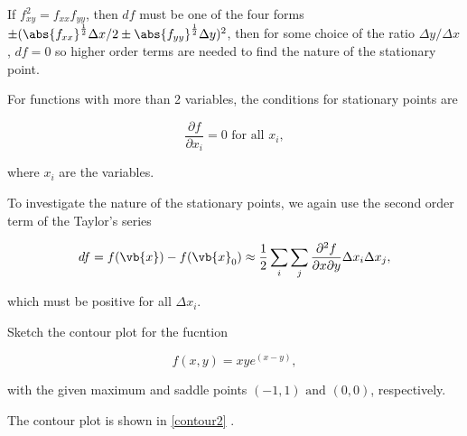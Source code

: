 \documentclass[english,a4paper,12pt]{report}
\begin{document}
If \(f_{xy}^2 = f_{xx}f_{yy}\), then \(df\) must be one of the four forms \(\pm  (\abs{f_{xx} }^{\frac{1}{2} } \Delta x /2 \pm \abs{f_{yy} }^{\frac{1}{2} }\Delta y)^2\), then for some choice of the ratio \(\Delta y / \Delta x\), \(df = 0\) so higher order terms are needed to find the nature of the stationary point. 

For functions with more than 2 variables, the conditions for stationary points are 

\begin{equation}
    \frac{\partial f}{\partial x_{i} } = 0 \text{ for all }  x_{i},
\end{equation}

where \(x_{i} \) are the variables. 

To investigate the nature of the stationary points, we again use the second order term of the Taylor's series

\begin{equation}
    df = f(\vb{x} ) - f(\vb{x} _{0} ) \approx \frac{1}{2}\sum_{i} \sum_{j} \frac{\partial^2 f}{\partial x \partial y} \Delta x_{i}\Delta x_{j},      
\end{equation}

which must be positive for all \(\Delta x_{i} \).

{Sketch the contour plot for the fucntion 

\begin{equation}
	f(x,y) = xy e^{(x-y)}, 
\end{equation}

with the given maximum and saddle points \((-1,1) \text { and } (0,0)\), respectively. 
}
{The contour plot is shown in \cref{contour2} }. 

\end{document}

